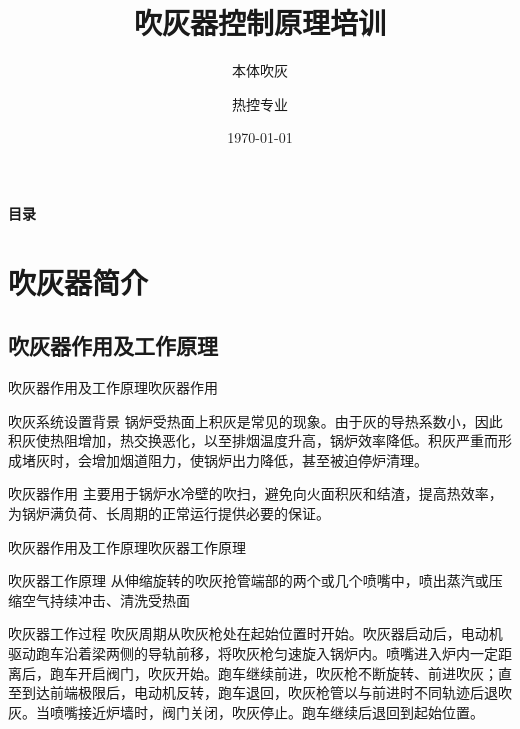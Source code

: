 \documentclass[12pt,hyperref={CJKbookmarks=true}]{beamer} %
\begin{document}
	
	\kaishu
	
	\title{吹灰器控制原理培训}
\subtitle{本体吹灰}
	\author{热控专业}
	\date{\today}
	\begin{frame}
		\titlepage
	\end{frame}
\begin{frame}{\textbf{目录}}
\tableofcontents
\end{frame}
	\section{吹灰器简介}
	\subsection{吹灰器作用及工作原理}
\begin{frame}{吹灰器作用及工作原理}{吹灰器作用}
\begin{block}{吹灰系统设置背景}
			 锅炉受热面上积灰是常见的现象。由于灰的导热系数小，因此积灰使热阻增加，热交换恶化，以至排烟温度升高，锅炉效率降低。积灰严重而形成堵灰时，会增加烟道阻力，使锅炉出力降低，甚至被迫停炉清理。
		\end{block}
\begin{exampleblock}{吹灰器作用}
主要用于锅炉水冷壁的吹扫，避免向火面积灰和结渣，提高热效率，为锅炉满负荷、长周期的正常运行提供必要的保证。
		\end{exampleblock}
		
	\end{frame}
\begin{frame}{吹灰器作用及工作原理}{吹灰器工作原理}
\begin{block}{吹灰器工作原理}
			从伸缩旋转的吹灰抢管端部的两个或几个喷嘴中，喷出蒸汽或压缩空气持续冲击、清洗受热面
		\end{block}
\begin{exampleblock}{吹灰器工作过程}
吹灰周期从吹灰枪处在起始位置时开始。吹灰器启动后，电动机驱动跑车沿着梁两侧的导轨前移，将吹灰枪匀速旋入锅炉内。喷嘴进入炉内一定距离后，跑车开启阀门，吹灰开始。跑车继续前进，吹灰枪不断旋转、前进吹灰；直至到达前端极限后，电动机反转，跑车退回，吹灰枪管以与前进时不同轨迹后退吹灰。当喷嘴接近炉墙时，阀门关闭，吹灰停止。跑车继续后退回到起始位置。
		\end{exampleblock}
	\end{frame}
\end{document}
